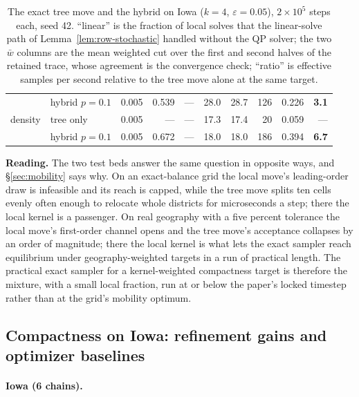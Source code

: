 \documentclass[11pt]{article}
\begin{document}
\begin{table}[htbp]
\begin{tabular}{llrrrrrrrr}
 & hybrid $p{=}0.1$ & 0.005 & 0.539 & --- & 28.0 & 28.7 & 126 & 0.226 & \textbf{3.1} \\
density & tree only & 0.005 & --- & --- & 17.3 & 17.4 & 20 & 0.059 & --- \\
 & hybrid $p{=}0.1$ & 0.005 & 0.672 & --- & 18.0 & 18.0 & 186 & 0.394 & \textbf{6.7} \\
\bottomrule
\end{tabular}
\caption{The exact tree move and the hybrid on Iowa ($k = 4$,
  $\varepsilon = 0.05$), $2 \times 10^5$ steps each, seed 42.
  ``linear'' is the fraction of local solves that the linear-solve
  path of Lemma~\ref{lem:row-stochastic} handled without the QP
  solver; the two $\bar w$ columns are the mean weighted cut over the
  first and second halves of the retained trace, whose agreement is
  the convergence check; ``ratio'' is effective samples per second
  relative to the tree move alone at the same
  target.}\label{tab:hybrid-iowa}
\end{table}

\textbf{Reading.} The two test beds answer the same question in
opposite ways, and \S\ref{sec:mobility} says why. On an exact-balance
grid the local move's leading-order draw is infeasible and its reach
is capped, while the tree move splits ten cells evenly often enough
to relocate whole districts for microseconds a step; there the local
kernel is a passenger. On real geography with a five percent
tolerance the local move's first-order channel opens and the tree
move's acceptance collapses by an order of magnitude; there the local
kernel is what lets the exact sampler reach equilibrium under
geography-weighted targets in a run of practical length. The
practical exact sampler for a kernel-weighted compactness target is
therefore the mixture, with a small local fraction, run at or below
the paper's locked timestep rather than at the grid's mobility
optimum.

\subsection{Compactness on Iowa: refinement gains and optimizer baselines}\label{sec:exp-compactness}

\paragraph{Iowa (6 chains).}\label{sec:exp-iowa}
\end{document}
